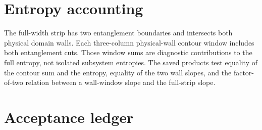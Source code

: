 \documentclass[aps,prb,onecolumn,nofootinbib,superscriptaddress]{revtex4-2}
\begin{document}
\section{Entropy accounting}
The full-width strip has two entanglement boundaries and intersects both physical domain
walls.  Each three-column physical-wall contour window includes both entanglement cuts.
Those window sums are diagnostic contributions to the full entropy, not isolated subsystem
entropies.  The saved products test equality of the contour sum and the entropy, equality
of the two wall slopes, and the factor-of-two relation between a wall-window slope and the
full-strip slope.

\section{Acceptance ledger}
\end{document}
